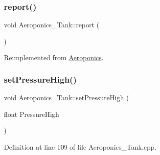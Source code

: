 \subsubsection{\texorpdfstring{report()}{report()}\hspace{0.1cm}{\footnotesize\ttfamily [2/2]}}
{\footnotesize\ttfamily void Aeroponics\+\_\+\+Tank\+::report (\begin{DoxyParamCaption}{ }\end{DoxyParamCaption})\hspace{0.3cm}{\ttfamily [virtual]}}



Reimplemented from \hyperlink{class_aeroponics_a3dbfce027ab5fa736a6007a6ae75ee4e}{Aeroponics}.

\mbox{\label{class_aeroponics___tank_a6081920c94e5909b98c1f9aa85bcf108}} 
\subsubsection{\texorpdfstring{set\+Pressure\+High()}{setPressureHigh()}\hspace{0.1cm}{\footnotesize\ttfamily [1/2]}}
{\footnotesize\ttfamily void Aeroponics\+\_\+\+Tank\+::set\+Pressure\+High (\begin{DoxyParamCaption}\item[{float}]{Pressure\+High }\end{DoxyParamCaption})\hspace{0.3cm}{\ttfamily [protected]}}



Definition at line 109 of file Aeroponics\+\_\+\+Tank.\+cpp.

